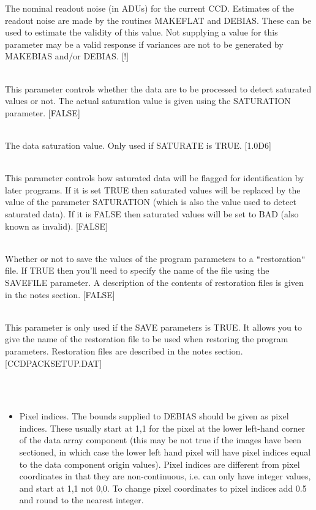 \documentclass[twoside,11pt]{article}
\newcommand{\htmlref}[2]{#1}
\renewcommand{\_}{\texttt{\symbol{95}}}
\newcommand{\qt}[1]{{\tt "}#1{\tt "}}
\newcommand{\xroutine}[1]{\htmlref{{\sc #1}}{#1}}
\newcommand{\sstsubsection}[1]{ \item[{#1}] \mbox{} \\}
\newcommand{\sstnotes}[1]{\item[Notes:] \mbox{} \\[1.3ex] #1}
\newcommand{\sstitemlist}[1]{
  \mbox{} \\
  \vspace{-3.5ex}
  \begin{itemize}
     #1
  \end{itemize}
}
\newcommand{\sstitem}{\item}
\newcommand{\sstsubsection}[1]{\item[{#1}]}
\newcommand{\sstnotes}[1]{\item[Notes:] #1 }
\newcommand{\sstitemlist}[1]{
      \begin{itemize}
         #1
      \end{itemize}
      \\
   }
\newcommand{\sstitem}{\item}
\begin{document}
{{{      } {
         The nominal readout noise (in ADUs) for the current CCD.
         Estimates of the readout noise are made by the routines
         \xroutine{MAKEFLAT} and \xroutine{DEBIAS}. These can be used to estimate the
         validity of this value. Not supplying a value for this
         parameter may be a valid response if variances are not to be
         generated by \xroutine{MAKEBIAS} and/or \xroutine{DEBIAS}.
         [!]
      }
      \sstsubsection{
         SATURATE = \_LOGICAL (Read)
      } {
         This parameter controls whether the data are to be processed to
         detect saturated values or not. The actual saturation value is
         given using the SATURATION parameter.
         [FALSE]
      }
      \sstsubsection{
         SATURATION = \_DOUBLE (Read)
      } {
         The data saturation value. Only used if SATURATE is TRUE.
         [1.0D6]
      }
      \sstsubsection{
         SETSAT = \_LOGICAL (Read)
      } {
         This parameter controls how saturated data will be flagged for
         identification by later programs. If it is set TRUE then saturated
         values will be replaced by the value of the parameter SATURATION
         (which is also the value used to detect saturated data). If it is
         FALSE then saturated values will be set to BAD (also known as
         invalid).
         [FALSE]
      }
      \sstsubsection{
         SAVE = \_LOGICAL (Read)
      } {
         Whether or not to save the values of the program parameters to a
         \qt{restoration} file. If TRUE then you'll need to specify the name
         of the file using the SAVEFILE parameter. A description of the
         contents of restoration files is given in the notes section.
         [FALSE]
      }
      \sstsubsection{
         SAVEFILE = FILENAME (Read)
      } {
         This parameter is only used if the SAVE parameters is TRUE.
         It allows you to give the name of the restoration file to be used
         when restoring the program parameters. Restoration files are
         described in the notes section.
         [CCDPACK\_SETUP.DAT]
      }
   }
   \sstnotes{
      \sstitemlist{

         \sstitem
         Pixel indices. The bounds supplied to \xroutine{DEBIAS} should be given as
           pixel indices. These usually start at 1,1 for the pixel at the
           lower left-hand corner of the data array component (this may
           be not true if the images have been sectioned, in which case the
           lower left hand pixel will have pixel indices equal to the data
           component origin values). Pixel indices are different from
           pixel coordinates in that they are non-continuous, i.e. can
           only have integer values, and start at 1,1 not 0,0. To change
           pixel coordinates to pixel indices add 0.5 and round to the
           nearest integer.

}}}
\end{document}
